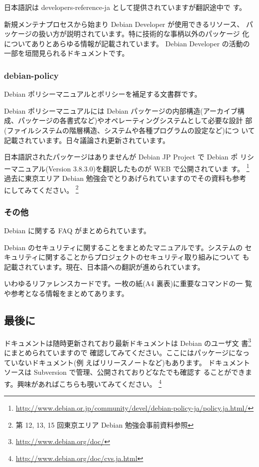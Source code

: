 \documentclass[mingoth,a4paper]{jsarticle}
\begin{document}
日本語訳は developers-reference-ja として提供されていますが翻訳途中で
す。

新規メンテナプロセスから始まり Debian Developer が使用できるリソース、
パッケージの扱い方が説明されています。特に技術的な事柄以外のパッケージ
化についてありとあらゆる情報が記載されています。
Debian Developer の活動の一部を垣間見られるドキュメントです。


\subsubsection{debian-policy}
Debian ポリシーマニュアルとポリシーを補足する文書群です。

Debian ポリシーマニュアルには Debian パッケージの内部構造(アーカイブ構
成、パッケージの各書式など)やオペレーティングシステムとして必要な設計
部(ファイルシステムの階層構造、システムや各種プログラムの設定など)につ
いて記載されています。日々議論され更新されています。

日本語訳されたパッケージはありませんが Debian JP Project で Debian ポ
リシーマニュアル(Version 3.8.3.0)を翻訳したものが WEB で公開されていま
す。
\footnote{\url{http://www.debian.or.jp/community/devel/debian-policy-ja/policy.ja.html/}}
過去に東京エリア Debian 勉強会でとりあげられていますのでその資料も参考
にしてみてください。
\footnote{第 12, 13, 15 回東京エリア Debian 勉強会事前資料参照}


\subsubsection{その他}
Debian に関する FAQ がまとめられています。


Debian のセキュリティに関することをまとめたマニュアルです。システムの
セキュリティに関することからプロジェクトのセキュリティ取り組みについて
も記載されています。現在、日本語への翻訳が進められています。


いわゆるリファレンスカードです。一枚の紙(A4 裏表)に重要なコマンドの一
覧や参考となる情報をまとめてあります。


\subsection{最後に}

ドキュメントは随時更新されており最新ドキュメントは  Debian のユーザ文
書\footnote{\url{http://www.debian.org/doc/}}にまとめられていますので
確認してみてください。ここにはパッケージになっていないドキュメント(例
えばリリースノートなど)もあります。
ドキュメントソースは Subversion で管理、公開されておりどなたでも確認す
ることができます。興味があればこちらも覗いてみてください。
\footnote{\url{http://www.debian.org/doc/cvs.ja.html}}
\end{document}
